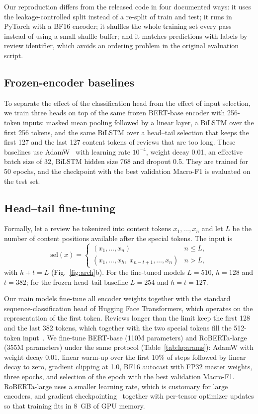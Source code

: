 \documentclass[conference]{IEEEtran}
\begin{document}
Our reproduction differs from the released code in four documented ways: it uses the leakage-controlled split instead of a re-split of train and test; it runs in PyTorch with a BF16 encoder; it shuffles the whole training set every pass instead of using a small shuffle buffer; and it matches predictions with labels by review identifier, which avoids an ordering problem in the original evaluation script.

\subsection{Frozen-encoder baselines}
To separate the effect of the classification head from the effect of input selection, we train three heads on top of the same frozen BERT-base encoder with 256-token inputs: masked mean pooling followed by a linear layer, a BiLSTM over the first 256 tokens, and the same BiLSTM over a head--tail selection that keeps the first 127 and the last 127 content tokens of reviews that are too long. These baselines use AdamW~\cite{loshchilov2019} with learning rate $10^{-4}$, weight decay 0.01, an effective batch size of 32, BiLSTM hidden size 768 and dropout 0.5. They are trained for 50 epochs, and the checkpoint with the best validation Macro-F1 is evaluated on the test set.

\subsection{Head--tail fine-tuning}
Formally, let a review be tokenized into content tokens $x_1,\dots,x_n$ and let $L$ be the number of content positions available after the special tokens. The input is
\begin{equation}
\mathrm{sel}(x) =
\begin{cases}
(x_1,\dots,x_n) & n \le L,\\
(x_1,\dots,x_h,\; x_{n-t+1},\dots,x_n) & n > L,
\end{cases}
\end{equation}
with $h+t=L$ (Fig.~\ref{fig:arch}b). For the fine-tuned models $L=510$, $h=128$ and $t=382$; for the frozen head--tail baseline $L=254$ and $h=t=127$.

Our main models fine-tune all encoder weights together with the standard sequence-classification head of Hugging Face Transformers, which operates on the representation of the first token. Reviews longer than the limit keep the first 128 and the last 382 tokens, which together with the two special tokens fill the 512-token input~\cite{sun2019}. We fine-tune BERT-base (110M parameters) and RoBERTa-large (355M parameters) under the same protocol (Table~\ref{tab:hparams}): AdamW with weight decay 0.01, linear warm-up over the first 10\% of steps followed by linear decay to zero, gradient clipping at 1.0, BF16 autocast with FP32 master weights, three epochs, and selection of the epoch with the best validation Macro-F1. RoBERTa-large uses a smaller learning rate, which is customary for large encoders, and gradient checkpointing~\cite{chen2016} together with per-tensor optimizer updates so that training fits in 8~GB of GPU memory.
\end{document}
